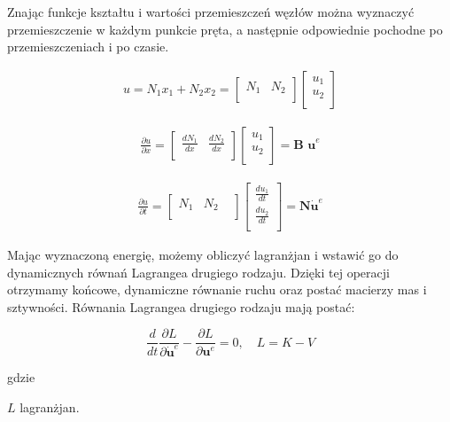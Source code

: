 Znając funkcje kształtu i wartości przemieszczeń węzłów można wyznaczyć przemieszczenie w każdym punkcie pręta, a następnie odpowiednie pochodne po przemieszczeniach i po czasie.

\begin{gather}
u = N_1 x_1 + N_2 x_2 = 
	\begin{bmatrix} 
	 	N_1 & N_2 \\
	\end{bmatrix}
	\begin{bmatrix} 
	 	u_1 \\
		u_2 \\
	\end{bmatrix}
\end{gather}

\begin{gather}
\frac{\partial u}{\partial x}= 
	\begin{bmatrix} 
	 	\frac{d N_1}{d x} & \frac{d N_2}{d x} \\
	\end{bmatrix}
	\begin{bmatrix} 
	 	u_1 \\
		u_2 \\
	\end{bmatrix} = \textbf{B u}^e
\end{gather}


\begin{gather}
\frac{\partial u}{\partial t}= 
	\begin{bmatrix} 
	 	N_1 &  N_2 & \\
	\end{bmatrix}
	\begin{bmatrix} 
	 	\frac{du_1}{dt} \\
		\frac{du_2}{dt}\\
	\end{bmatrix} = \textbf{N} \dot{\textbf{u}}^e
\end{gather}


	Mając wyznaczoną energię, możemy obliczyć lagranżjan i wstawić go do dynamicznych równań Lagrangea drugiego rodzaju. Dzięki tej operacji otrzymamy końcowe, dynamiczne równanie ruchu oraz postać macierzy mas i sztywności. Równania Lagrangea drugiego rodzaju mają postać:

\begin{equation}
\frac{d}{dt} \frac{\partial L}{\partial \dot{\textbf{u}}^e} - \frac{\partial L}{\partial \textbf{u}^e} = 0, \quad L = K - V
\end{equation}

gdzie
\begin{eqwhere}[2cm]
	\item[$L$] lagranżjan.
\end{eqwhere}

